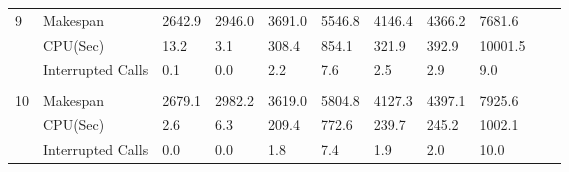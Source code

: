 \documentclass[runningheads]{llncs}
\begin{document}
\begin{table}[!h]
{\begin{minipage}{\textwidth}
\begin{tabular}{l l l l l l l l l l l}
    9                & Makespan             & 2642.9	& 2946.0   & 3691.0	     & 5546.8	   & 4146.4	 & 4366.2  & 7681.6 \\
                     & CPU(Sec)             & 13.2	    & 3.1	   & 308.4	     & 854.1	   & 321.9	 & 392.9   & 10001.5 \\
                     & Interrupted Calls    & 0.1	    & 0.0      & 2.2	     & 7.6	       & 2.5	 & 2.9     & 9.0 \\\\
                     
    10               & Makespan             & 2679.1	& 2982.2   & 3619.0	     & 5804.8	   & 4127.3	 & 4397.1  & 7925.6 \\
                     & CPU(Sec)             & 2.6	    & 6.3	   & 209.4	     & 772.6	   & 239.7	 & 245.2   & 1002.1 \\
                     & Interrupted Calls    & 0.0	    & 0.0      & 1.8	     & 7.4	       & 1.9	 & 2.0     & 10.0 \\
    
    \hline
    \end{tabular}
     \end{minipage}}
\end{table}
\end{document}
